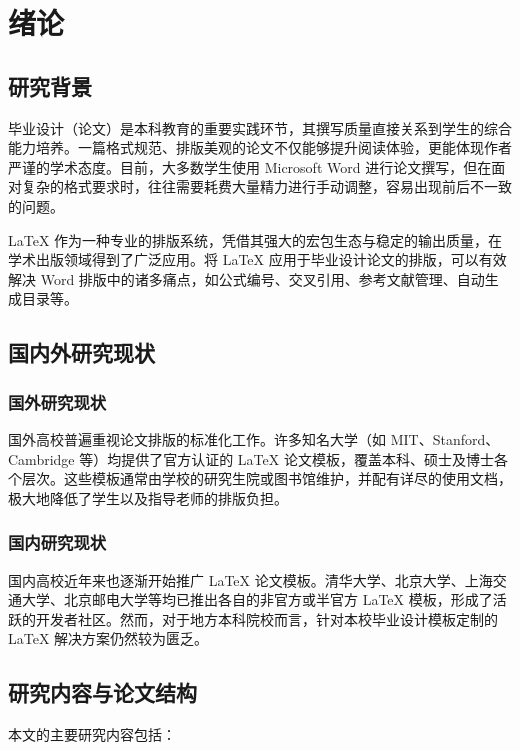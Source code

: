 \section{绪论}
\subsection{研究背景}
毕业设计（论文）是本科教育的重要实践环节，其撰写质量直接关系到学生的综合能力培养。一篇格式规范、排版美观的论文不仅能够提升阅读体验，更能体现作者严谨的学术态度。目前，大多数学生使用 Microsoft Word 进行论文撰写，但在面对复杂的格式要求时，往往需要耗费大量精力进行手动调整，容易出现前后不一致的问题\cite{knuth1984texbook}。

\LaTeX{} 作为一种专业的排版系统，凭借其强大的宏包生态与稳定的输出质量，在学术出版领域得到了广泛应用。将 \LaTeX{} 应用于毕业设计论文的排版，可以有效解决 Word 排版中的诸多痛点，如公式编号、交叉引用、参考文献管理、自动生成目录等\cite{lamport1994latex}。

\subsection{国内外研究现状}

\subsubsection{国外研究现状}

国外高校普遍重视论文排版的标准化工作。许多知名大学（如 MIT、Stanford、Cambridge 等）均提供了官方认证的 \LaTeX{} 论文模板，覆盖本科、硕士及博士各个层次\cite{mittelbach2004latex}。这些模板通常由学校的研究生院或图书馆维护，并配有详尽的使用文档，极大地降低了学生以及指导老师的排版负担。

\subsubsection{国内研究现状}

国内高校近年来也逐渐开始推广 \LaTeX{} 论文模板。清华大学、北京大学、上海交通大学、北京邮电大学等均已推出各自的非官方或半官方 \LaTeX{} 模板，形成了活跃的开发者社区\cite{wang2007latex}。然而，对于地方本科院校而言，针对本校毕业设计模板定制的 \LaTeX{} 解决方案仍然较为匮乏。

\subsection{研究内容与论文结构}

本文的主要研究内容包括：

